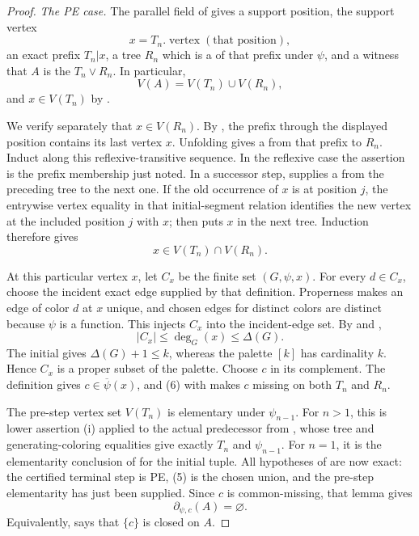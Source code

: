 \begin{proof}
\emph{The PE case.}
The parallel field of  gives a support position,
the support vertex
\[
                 x=T_n.\operatorname{vertex}(\text{that position}),
\]
an exact prefix $T_n|x$, a tree $R_n$ which is a
 of that prefix under $\psi$, and a witness
that $A$ is the  $T_n\vee R_n$.  In
particular,
\[
 V(A)=V(T_n)\cup V(R_n),                              \tag{5}
\]
and $x\in V(T_n)$ by .

We verify separately that $x\in V(R_n)$.  By
, the prefix through the displayed position
contains its last vertex $x$.  Unfolding 
gives a  from that prefix to
$R_n$.  Induct along this reflexive-transitive sequence.  In the
reflexive case the assertion is the prefix membership just noted.  In a
successor step,  supplies a
 from the preceding tree to the next
one.  If the old occurrence of $x$ is at position $j$, the entrywise
vertex equality in that initial-segment relation identifies the new
vertex at the included position $j$ with $x$; then
 puts $x$ in the next tree.  Induction
therefore gives
\[
                     x\in V(T_n)\cap V(R_n).          \tag{6}
\]

At this particular vertex $x$, let $C_x$ be the finite set
$(G,\psi,x)$.  For every $d\in C_x$, choose the
incident exact edge supplied by that definition.  Properness makes an
edge of color $d$ at $x$ unique, and chosen edges for distinct colors are
distinct because $\psi$ is a function.  This injects $C_x$ into the
incident-edge set.  By  and ,
\[
 |C_x|\leq\deg_G(x)\leq\Delta(G).
\]
The initial  gives $\Delta(G)+1\leq k$, whereas the
palette $[k]$ has cardinality $k$.  Hence $C_x$ is a proper subset of the
palette.  Choose $c$ in its complement.  The definition
 gives $c\in\overline\psi(x)$, and (6) with
 makes $c$ missing on both $T_n$ and $R_n$.

The pre-step vertex set $V(T_n)$ is elementary under $\psi_{n-1}$.  For
$n>1$, this is lower assertion (i) applied to the actual predecessor from
, whose tree and generating-coloring
equalities give exactly $T_n$ and $\psi_{n-1}$.  For $n=1$, it is the
elementarity conclusion of  for the
initial tuple.  All hypotheses of
 are now exact: the certified
terminal step is PE, (5) is the chosen union, and the pre-step
elementarity has just been supplied.  Since $c$ is common-missing, that
lemma gives
\[
                 \partial_{\psi,c}(A)=\varnothing.   \tag{7}
\]
Equivalently,  says that $\{c\}$ is closed
on $A$.


\end{proof}
